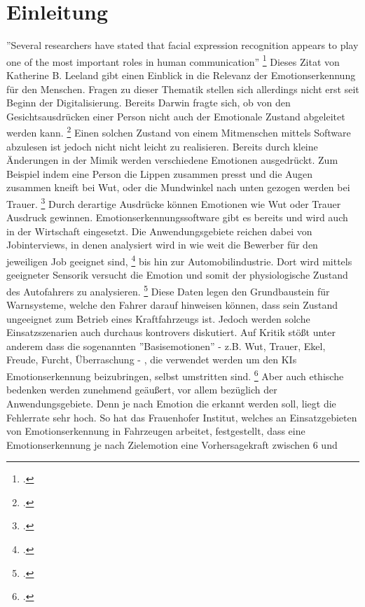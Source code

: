 \documentclass[12pt, a4paper]{report}
\begin{document}
\tableofcontents
\listoffigures
\listoftables
\lstlistoflistings
\newpage
\chapter{Einleitung}
\pagestyle{plain}
\setcounter{page}{1}
''Several researchers have stated that facial expression recognition appears to play one of the most important roles in human communication'' 
\footcite[Vgl.][1]{FaceRec}
Dieses Zitat von Katherine B. Leeland gibt einen Einblick in die Relevanz der Emotionserkennung für den Menschen. Fragen zu dieser Thematik stellen sich allerdings nicht erst seit Beginn der Digitalisierung. Bereits Darwin
fragte sich, ob von den Gesichtsausdrücken einer Person nicht auch der Emotionale Zustand abgeleitet werden kann.
\footcite[Vgl.][2]{FaceRec}
Einen solchen Zustand von einem Mitmenschen mittels Software abzulesen ist jedoch nicht nicht leicht zu realisieren. Bereits durch kleine Änderungen in der Mimik werden verschiedene Emotionen ausgedrückt. Zum Beispiel indem eine Person die Lippen zusammen presst und die Augen zusammen kneift bei Wut, oder die Mundwinkel nach unten gezogen werden bei Trauer.
\footcite[Vgl.][249]{HandbookFaceRec}
Durch derartige Ausdrücke können Emotionen wie Wut oder Trauer Ausdruck gewinnen.
Emotionserkennungssoftware gibt es bereits und wird auch in der Wirtschaft eingesetzt. Die Anwendungsgebiete reichen dabei von Jobinterviews, in denen analysiert wird in wie weit die Bewerber für
den jeweiligen Job geeignet sind, 
\footcite[Vgl.][]{mixedArticle}
bis hin zur Automobilindustrie. Dort wird mittels geeigneter Sensorik versucht die Emotion und somit der physiologische Zustand des Autofahrers zu analysieren.
\footcite[Vgl.][Herausforderung]{Frauenhofer}
Diese Daten legen den Grundbaustein für Warnsysteme, welche den Fahrer darauf hinweisen können, dass sein Zustand ungeeignet zum Betrieb eines Kraftfahrzeugs ist. Jedoch werden
solche Einsatzszenarien auch durchaus kontrovers diskutiert. Auf Kritik stößt unter anderem dass die sogenannten ''Basisemotionen'' - z.B. Wut, Trauer, Ekel, Freude, Furcht, Überraschung - , die verwendet werden um den KIs Emotionserkennung
beizubringen, selbst umstritten sind.
\footcite[Vgl.][]{SZ}
Aber auch ethische bedenken werden zunehmend geäußert, vor allem bezüglich der Anwendungsgebiete. Denn je nach Emotion die erkannt werden soll, liegt die Fehlerrate sehr hoch. So hat das
Frauenhofer Institut, welches an Einsatzgebieten von Emotionserkennung in Fahrzeugen arbeitet, festgestellt, dass eine Emotionserkennung je nach Zielemotion eine Vorhersagekraft zwischen 6 und
\end{document}
